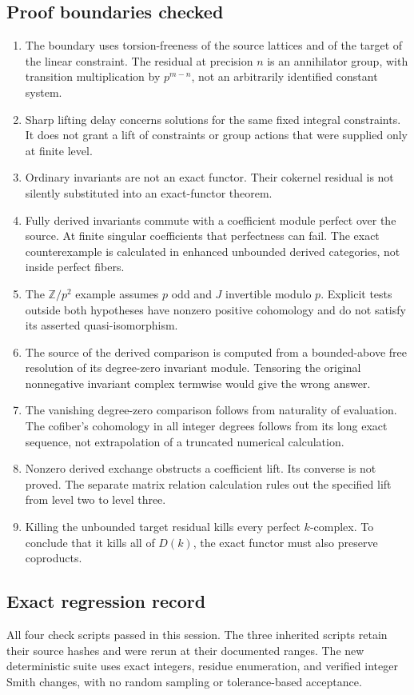\subsection{Proof boundaries checked}
\begin{enumerate}
\item The boundary uses torsion-freeness of the source lattices and of the target of the linear constraint. The residual at precision $n$ is an annihilator group, with transition multiplication by $p^{m-n}$, not an arbitrarily identified constant system.
\item Sharp lifting delay concerns solutions for the same fixed integral constraints. It does not grant a lift of constraints or group actions that were supplied only at finite level.
\item Ordinary invariants are not an exact functor. Their cokernel residual is not silently substituted into an exact-functor theorem.
\item Fully derived invariants commute with a coefficient module perfect over the source. At finite singular coefficients that perfectness can fail. The exact counterexample is calculated in enhanced unbounded derived categories, not inside perfect fibers.
\item The $\mathbb Z/p^2$ example assumes $p$ odd and $J$ invertible modulo $p$. Explicit tests outside both hypotheses have nonzero positive cohomology and do not satisfy its asserted quasi-isomorphism.
\item The source of the derived comparison is computed from a bounded-above free resolution of its degree-zero invariant module. Tensoring the original nonnegative invariant complex termwise would give the wrong answer.
\item The vanishing degree-zero comparison follows from naturality of evaluation. The cofiber's cohomology in all integer degrees follows from its long exact sequence, not extrapolation of a truncated numerical calculation.
\item Nonzero derived exchange obstructs a coefficient lift. Its converse is not proved. The separate matrix relation calculation rules out the specified lift from level two to level three.
\item Killing the unbounded target residual kills every perfect $k$-complex. To conclude that it kills all of $D(k)$, the exact functor must also preserve coproducts.
\end{enumerate}

\subsection{Exact regression record}
All four check scripts passed in this session. The three inherited scripts retain their source hashes and were rerun at their documented ranges. The new deterministic suite uses exact integers, residue enumeration, and verified integer Smith changes, with no random sampling or tolerance-based acceptance.


